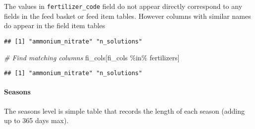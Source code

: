 \documentclass[
]{article}
\newenvironment{Shaded}{\begin{snugshade}}{\end{snugshade}}
\newcommand{\CommentTok}[1]{\textcolor[rgb]{0.56,0.35,0.01}{\textit{#1}}}
\newcommand{\FunctionTok}[1]{\textcolor[rgb]{0.00,0.00,0.00}{#1}}
\newcommand{\NormalTok}[1]{#1}
\newcommand{\OtherTok}[1]{\textcolor[rgb]{0.56,0.35,0.01}{#1}}
\newcommand{\SpecialCharTok}[1]{\textcolor[rgb]{0.00,0.00,0.00}{#1}}
\newcommand{\StringTok}[1]{\textcolor[rgb]{0.31,0.60,0.02}{#1}}
\begin{document}
The values in \texttt{fertilizer\_code} field do not appear directly
correspond to any fields in the feed basket or feed item tables. However
columns with similar names do appear in the field item tables

\begin{Shaded}
\end{Shaded}

\begin{verbatim}
## [1] "ammonium_nitrate" "n_solutions"
\end{verbatim}

\begin{Shaded}
\begin{Highlighting}[]
\CommentTok{\# Find matching columns}
\NormalTok{fi\_cols[fi\_cols }\SpecialCharTok{\%in\%}\NormalTok{ fertilizers]}
\end{Highlighting}
\end{Shaded}

\begin{verbatim}
## [1] "ammonium_nitrate" "n_solutions"
\end{verbatim}

\hypertarget{seasons}{%
\paragraph{Seasons}\label{seasons}}

The seasons level is simple table that records the length of each season
(adding up to 365 days max).

\begin{Shaded}
\end{Shaded}
\end{document}
